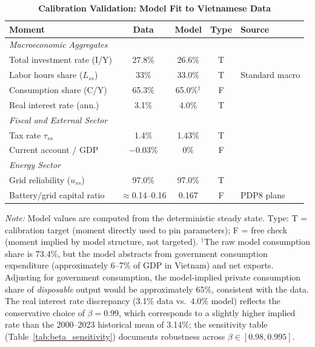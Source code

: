 \documentclass[12pt, a4paper]{article}
\begin{document}
	\begin{table}[H]
		\centering
		\caption{\textbf{Calibration Validation: Model Fit to Vietnamese Data}}
		\label{tab:validation}
		\renewcommand{\arraystretch}{1.3}
		\small
		\begin{tabular}{l c c c p{3.5cm}}
			\toprule
			\textbf{Moment} & \textbf{Data} & \textbf{Model} & \textbf{Type} & \textbf{Source} \\
			\midrule
			\multicolumn{5}{l}{\textit{Macroeconomic Aggregates}} \\
			Total investment rate (I/Y) & 27.8\% & 26.6\% & T & \citep{gso2024} \\
			Labor hours share ($L_{ss}$) & 33\% & 33.0\% & T & Standard macro \\
			Consumption share (C/Y) & 65.3\% & 65.0\%$^{\dagger}$ & F & \citep{gso2024} \\
			Real interest rate (ann.) & 3.1\% & 4.0\% & T & \citep{worldbank2024} \\
			\midrule
			\multicolumn{5}{l}{\textit{Fiscal and External Sector}} \\
			Tax rate $\tau_{ss}$ & 1.4\% & 1.43\% & T & \citep{mof2023} \\
			Current account / GDP & $-0.03\%$ & 0\% & F & \citep{worldbank2024} \\
			\midrule
			\multicolumn{5}{l}{\textit{Energy Sector}} \\
			Grid reliability ($u_{ss}$) & 97.0\% & 97.0\% & T & \citep{evn2023} \\
			Battery/grid capital ratio & $\approx$0.14--0.16 & 0.167 & F & PDP8 plans \\
			\bottomrule
		\end{tabular}
		\vspace{0.2cm}
		\parbox{\textwidth}{\footnotesize \textit{Note:} Model values are computed from the deterministic steady state. Type: T = calibration target (moment directly used to pin parameters); F = free check (moment implied by model structure, not targeted). $^{\dagger}$The raw model consumption share is 73.4\%, but the model abstracts from government consumption expenditure (approximately 6--7\% of GDP in Vietnam) and net exports. Adjusting for government consumption, the model-implied private consumption share of \textit{disposable} output would be approximately 65\%, consistent with the data. The real interest rate discrepancy (3.1\% data vs.\ 4.0\% model) reflects the conservative choice of $\beta = 0.99$, which corresponds to a slightly higher implied rate than the 2000--2023 historical mean of 3.14\%; the sensitivity table (Table~\ref{tab:beta_sensitivity}) documents robustness across $\beta \in [0.98, 0.995]$.}
	\end{table}
	
\end{document}
